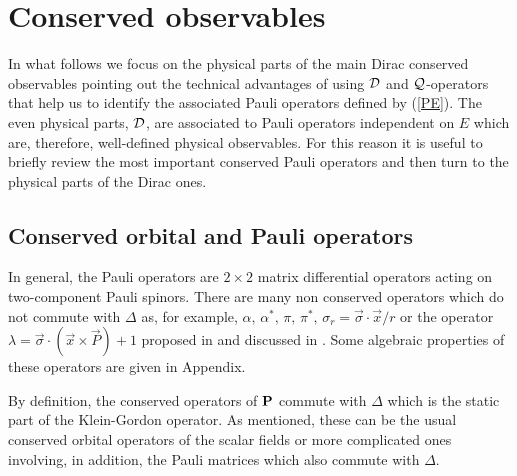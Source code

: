 \documentclass[a4paper,12pt]{article}
\begin{document}
\section{Conserved observables}

In what follows we focus on the physical parts of the main Dirac 
conserved observables  pointing out the technical advantages 
of using ${\cal D}$ and ${\cal Q}$-operators that help us to identify the 
associated Pauli operators defined by (\ref{PE}). The even physical 
parts, ${\cal D}$, are associated to Pauli operators independent on $E$  
which are, therefore, well-defined  physical observables. For this reason it 
is useful to briefly review the most important conserved Pauli operators and 
then turn to the physical parts of the Dirac  ones. 

\subsection{Conserved orbital and Pauli operators}

In general, the Pauli operators are $2\times 2$ matrix differential 
operators acting on two-component Pauli spinors. There are many 
non conserved operators which do not commute with $\Delta$ as, for example, 
$\alpha,\,
\alpha^{*},\,\pi,\,\pi^{*},\, \sigma_{r}=\vec{\sigma}\cdot\vec{x}/r$ or
the operator $\lambda=\vec{\sigma}\cdot(\vec{x}\times \vec{P})+1$ proposed 
in \cite{JMP} and discussed in \cite{HMH}. Some algebraic properties of 
these operators are given in Appendix. 
 
By definition, the conserved operators of ${\bf P}$ commute with $\Delta$ 
which is the static part of the Klein-Gordon operator. As mentioned, these 
can be the usual  conserved  orbital operators of the scalar fields or more 
complicated ones involving, in addition, the  Pauli matrices which 
also commute with $\Delta$.     
\end{document}
